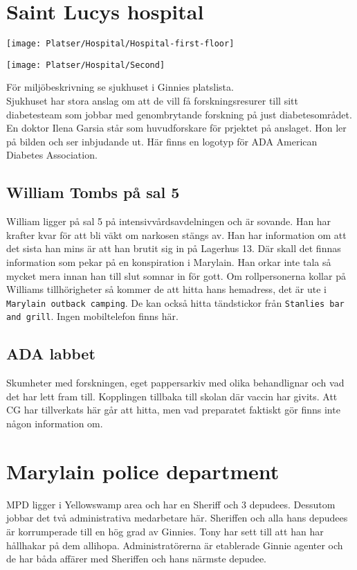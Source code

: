 \documentclass[a5paper,10pt]{report}
\begin{document}
\section{Saint Lucys hospital}
\texttt{[image: Platser/Hospital/Hospital-first-floor]}

\texttt{[image: Platser/Hospital/Second]}

För miljöbeskrivning se sjukhuset i Ginnies platslista.\\
Sjukhuset har stora anslag om att de vill få forskningsresurer till sitt diabetesteam som jobbar med genombrytande forskning på just diabetesområdet. En doktor Ilena Garsia står som huvudforskare för prjektet på anslaget. Hon ler på bilden och ser inbjudande ut. Här finns en logotyp för ADA American Diabetes Association.
\subsection{William Tombs på sal 5}
William ligger på sal 5 på intensivvårdsavdelningen och är sovande. Han har krafter kvar för att bli väkt om narkosen stängs av. Han har information om att det sista han mins är att han brutit sig in på Lagerhus 13. Där skall det finnas information som pekar på en konspiration i Marylain. Han orkar inte tala så mycket mera innan han till slut somnar in för gott. Om rollpersonerna kollar på Williams tillhörigheter så kommer de att hitta hans hemadress, det är ute i \texttt{Marylain outback camping}. De kan också hitta tändstickor från \texttt{Stanlies bar and grill}. Ingen mobiltelefon finns här.
\subsection{ADA labbet}
Skumheter med forskningen, eget pappersarkiv med olika behandlignar och vad det har lett fram till. Kopplingen tillbaka till skolan där vaccin har givits. Att CG har tillverkats här går att hitta, men vad preparatet faktiskt gör finns inte någon information om.
\section{Marylain police department}
MPD ligger i Yellowswamp area och har en Sheriff och 3 depudees. Dessutom jobbar det två administrativa medarbetare här. Sheriffen och alla hans depudees är korrumperade till en hög grad av Ginnies. Tony har sett till att han har hållhakar på dem allihopa. Administratörerna är etablerade Ginnie agenter och de har båda affärer med Sheriffen och hans närmste depudee.
\end{document}
